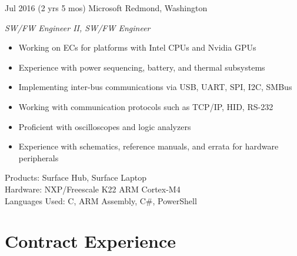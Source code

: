 \documentclass[print]{friggeri-cv} %
\begin{document}
\begin{entrylist}
\entry
{Jul 2016}
{(2 yrs 5 mos)}
{Microsoft}
{Redmond, Washington}
{\emph{SW/FW Engineer II, SW/FW Engineer}
\begin{itemize}
\item Working on ECs for platforms with Intel CPUs and Nvidia GPUs
\item Experience with power sequencing, battery, and thermal subsystems
\item Implementing inter-bus communications via USB, UART, SPI, I2C, SMBus
\item Working with communication protocols such as TCP/IP, HID, RS-232
\item Proficient with oscilloscopes and logic analyzers
\item Experience with schematics, reference manuals, and errata for hardware peripherals
\end{itemize}
Products: Surface Hub, Surface Laptop \\
Hardware: NXP/Freescale K22 ARM Cortex-M4 \\
Languages Used: C, ARM Assembly, C\#, PowerShell \\
}

\end{entrylist}

\goodbreak

\renewcommand{\entry}[5]{%
  \parbox[t]{1.4cm}{\footnotesize \textbf{#1} \\ \scriptsize\addfontfeature{Color=lightgray} #2}&\parbox[t]{18.0cm}{%
    \textbf{#3}%
    \hfill%
    {\footnotesize\addfontfeature{Color=lightgray} #4}%
    \justify #5\vspace{\parsep}%
  }\\}

\section{Contract Experience}
\label{sec:contract-experience}
\end{document}
